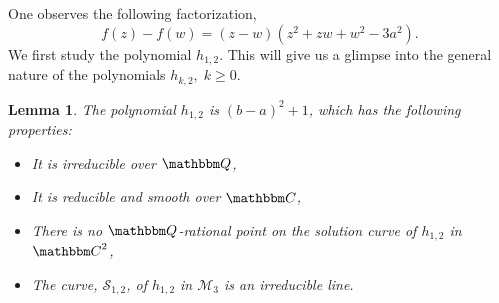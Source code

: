\documentclass[reqno]{amsart}
\numberwithin{equation}{section}
\theoremstyle{plain}
\newtheorem{lemma}[theorem]{Lemma}
\theoremstyle{definition}
\theoremstyle{definition}
\newcommand{\Q}{{\mathbbm Q}}
\newcommand{\C}{{\mathbbm C}}
\begin{document}
    One observes the following factorization,
    \begin{equation}\label{u'}
        f(z)-f(w)= (z-w)(z^{2}+zw+w^{2}-3a^{2}).
    \end{equation}
    We first study the polynomial $h_{1,2}$. This will give us a glimpse into the general nature of the polynomials $h_{k,2},\; k \geq 0$. 
    \begin{lemma}\label{h123}
        The polynomial $h_{1,2}$ is $(b-a)^{2}+1$, which has the following properties:
        \begin{itemize}
            \item It is irreducible over $\Q$,
            \item It is reducible and smooth over $\C$,
            \item There is no $\Q$-rational point on the solution curve of $h_{1,2}$ in $\C^{2}$,
            \item The curve, $\mathscr{S}_{1,2}$, of $h_{1,2}$ in $\mathcal{M}_{3}$ is an irreducible line.
        \end{itemize}
    \end{lemma}
\end{document}

